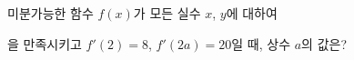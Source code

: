 미분가능한 함수 $f(x)$가 모든 실수 $x$, $y$에 대하여 \par\smallskip{}\par\smallskip\noindent 을 만족시키고 $f'(2)=8$, $f'(2a)=20$일 때, 상수 $a$의 값은?
